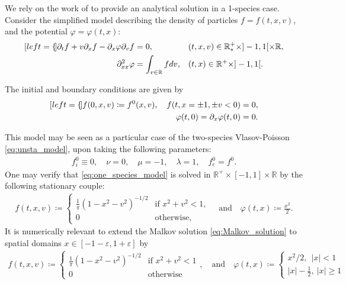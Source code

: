 \documentclass{article}
\numberwithin{equation}{section}
\newcommand{\R}{\mathbb{R}}
\newcommand{\mysubeq}[2]{ %
	\begin{subequations}\label{#1}
		\begin{align}[left = {\empheqlbrace}]
			#2
		\end{align}
	\end{subequations}	
}
\begin{document}
We rely on the work of \cite{malkovNonstationaryAntonovSelfgravitating2020} to provide an analytical solution in a 1-species case. Consider the simplified 
model describing the density of particles $f = f(t,x,v)$, and the potential $\varphi=\varphi(t,x)$:
\mysubeq{eq:one_species_model}{
	\partial_t f + v \partial_x f  - \partial_x \varphi \partial_v f &= 0, && (t,x,v) \in \R^+_* \times ]-1,1[ \times \mathbb{R}, \label{sta_1sp_f} \\
	\partial^2_{xx} \varphi &= \int_{v\in\mathbb{R}} f dv, && (t,x) \in \R^+ \times ]-1,1[. \label{sta_phi}
}
The initial and boundary conditions are given by 
\mysubeq{eq:one_species_model_bc}{
	f(0,x,v) \coloneqq f^0(x,v), \quad f(t,x=\pm1, \pm v < 0) &= 0,  \\
	\varphi(t,0) = \partial_x \varphi (t,0) &= 0.  
}
This model may be seen as a particular case of the two-species Vlasov-Poisson \cref{eq:unsta_model}, upon taking the following parameters:
\begin{align*}
	f_i^0 \equiv 0, \quad \nu = 0, \quad \mu = -1, \quad \lambda = 1, \quad f_e^0 = f^0.
\end{align*}
One may verify that \cref{eq:one_species_model} is solved in $\R^+ \times [-1,1] \times \mathbb{R}$ by the following stationary couple:
\begin{align}\label{eq:Malkov_solution}
	f(t,x,v) \coloneqq 
	\begin{cases}
		\frac{1}{\pi} \left(1 - x^2 - v^2\right)^{-1/2} & \text{if } x^2 + v^2 < 1,  \\
		0 & \text{otherwise}, 
	\end{cases} \quad \text{and} \quad
	\varphi(t,x) \coloneqq \frac{x^2}{2}.
\end{align}
It is numerically relevant to extend the Malkov solution \cref{eq:Malkov_solution} to spatial domains $x \in [-1-\varepsilon, 1+\varepsilon]$ by 
\begin{align}\label{eq:Malkov_solution_ext}
	f(t,x,v) \coloneqq 
	\begin{cases}
		\frac{1}{\pi} \left(1 - x^2 - v^2\right)^{-1/2} & \text{if } x^2 + v^2 < 1 \\
		0 & \text{otherwise}
	\end{cases}, \quad \text{and} \quad
	\varphi(t,x) \coloneqq \left\{\begin{array}{c}
	x^2/2,\ \ \left|x\right|<1\\
	|x|-\frac{1}{2},\ \left|x\right|\ge 1
	\end{array}\right.%
\end{align}
\end{document}
